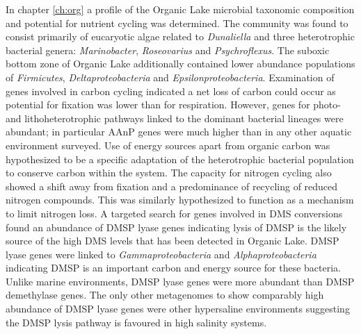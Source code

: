 In chapter \ref{ch:org} a profile of the Organic Lake microbial taxonomic composition and potential for nutrient cycling was determined.
The community was found to consist primarily of eucaryotic algae related to \emph{Dunaliella} and three heterotrophic bacterial genera: \emph{Marinobacter}, \emph{Roseovarius} and \emph{Psychroflexus}.
The suboxic bottom zone of Organic Lake additionally contained lower abundance populations of \emph{Firmicutes}, \emph{Deltaproteobacteria} and \emph{Epsilonproteobacteria}.
Examination of genes involved in carbon cycling indicated a net loss of carbon could occur as potential for fixation was lower than for respiration.
However, genes for photo- and lithoheterotrophic pathways linked to the dominant bacterial lineages were abundant; in particular \ac{AAnP} genes were much higher than in any other aquatic environment surveyed.
Use of energy sources apart from organic carbon was hypothesized to be a specific adaptation of the heterotrophic bacterial population to conserve carbon within the system.
The capacity for nitrogen cycling also showed a shift away from fixation and a predominance of recycling of reduced nitrogen compounds.
This was similarly hypothesized to function as a mechanism to limit nitrogen loss.
A targeted search for genes involved in \ac{DMS} conversions found an abundance of \ac{DMSP} lyase genes indicating lysis of \ac{DMSP} is the likely source of the high \ac{DMS} levels that has been detected in Organic Lake.
\ac{DMSP} lyase genes were linked to \emph{Gammaproteobacteria} and \emph{Alphaproteobacteria} indicating \ac{DMSP} is an important carbon and energy source for these bacteria.
Unlike marine environments, \ac{DMSP} lyase genes were more abundant than \ac{DMSP} demethylase genes. 
The only other metagenomes to show comparably high abundance of \ac{DMSP} lyase genes were other hypersaline environments suggesting the DMSP lysis pathway is favoured in high salinity systems. 

